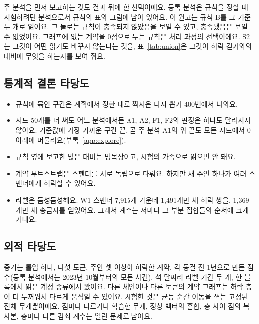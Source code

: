 주 분석을 먼저 보고하는 것도 결과 뒤에 한 선택이에요. 등록 분석은 규칙을 정할 때 시험하려던 분석으로서 규칙의 표와 그림에 남아 있어요. 이 원고는 규칙 B를 그 기준 두 개로 읽어요. 그 둘로는 규칙이 충족되지 않았음을 보일 수 있고, 충족됐음은 보일 수 없었어요. 그래프에 없는 계약을 0점으로 두는 규칙은 처리 과정의 선택이에요. S2는 그것이 어떤 읽기도 바꾸지 않는다는 것을, 표~\ref{tab:union}은 그것이 허락 걷기와의 대비에 무엇을 하는지를 보여 줘요.

\subsection{통계적 결론 타당도}

\begin{itemize}
\item 규칙에 묶인 구간은 계획에서 정한 대로 짝지은 다시 뽑기 400번에서 나와요.
\item 시드 50개를 더 써도 어느 분석에서든 A1, A2, F1, F2의 판정은 하나도 달라지지 않아요. 기준값에 가장 가까운 구간 끝, 곧 주 분석 A1의 위 끝도 모든 시드에서 0 아래에 머물러요(부록~\ref{app:explore}).
\item 규칙 옆에 보고한 많은 대비는 명목상이고, 시험의 가족으로 읽으면 안 돼요.
\item 계약 부트스트랩은 스펜더를 서로 독립으로 다뤄요. 하지만 새 주인 하나가 여러 스펜더에게 허락할 수 있어요.
\item 라벨은 듬성듬성해요. W1 스펜더 7,915개 가운데 1,491개만 새 허락 쌍을, 1,369개만 새 송금자를 얻었어요. 그래서 계수는 저마다 그 부분 집합들의 순서에 크게 기대요.
\end{itemize}

\subsection{외적 타당도}

증거는 롤업 하나, 다섯 토큰, 주인 셋 이상이 허락한 계약, 각 동결 전 1년으로 만든 점수(등록 분석에서는 2023년 10월부터의 모든 사건), 석 달짜리 라벨 기간 두 개, 한 블록에서 읽은 계정 종류에서 왔어요. 다른 체인이나 다른 토큰의 계약 그래프는 허락 층이 더 두꺼워서 다르게 움직일 수 있어요. 시험한 것은 균등 순간 이동을 쓰는 고정된 전체 무게뿐이에요. 점마다 다르거나 학습한 무게, 정상 벡터의 혼합, 층 사이 점의 복사본, 층마다 다른 감쇠 계수는 열린 문제로 남아요.
